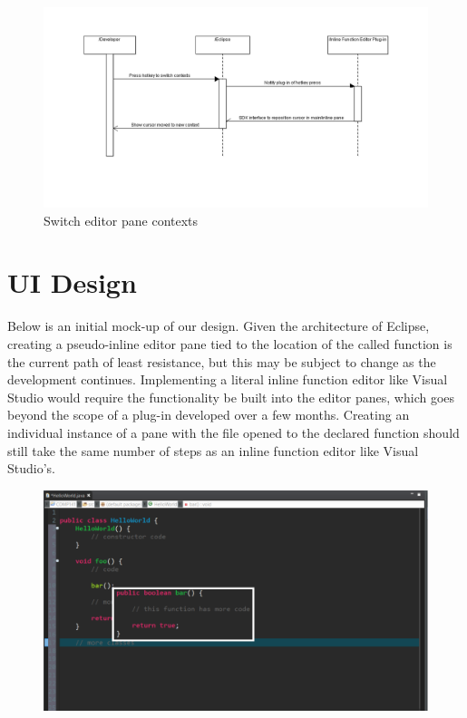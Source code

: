 \documentclass[]{report}
\begin{document}
	\begin{figure}
		\includegraphics[width=\linewidth]{imgs/switch_context.png}
		\caption{Switch editor pane contexts}
	\end{figure}

\chapter{UI Design}

	Below is an initial mock-up of our design.  Given the architecture of Eclipse, creating a pseudo-inline editor pane tied to the location of the called function is the current path of least resistance, but this may be subject to change as the development continues.  Implementing a literal inline function editor like Visual Studio would require the functionality be built into the editor panes, which goes beyond the scope of a plug-in developed over a few months.  Creating an individual instance of a pane with the file opened to the declared function should still take the same number of steps as an inline function editor like Visual Studio's.

	\begin{figure}[h!]
		\includegraphics[width=\linewidth]{imgs/ui_mockup.png}
	\end{figure}
\end{document}
